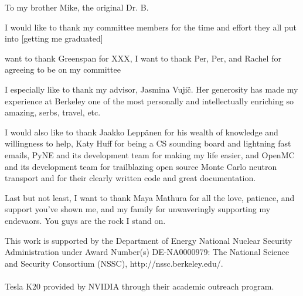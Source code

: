 \documentclass{ucbthesis}
\begin{document}
\begin{frontmatter}

\begin{dedication}
\null\vfil
\begin{center}
To my brother Mike, the original Dr. B. \\\vspace{12pt}

\end{center}
\vfil\null
\end{dedication}

\tableofcontents
\clearpage
\listoffigures
\clearpage
\listoftables

\begin{acknowledgements}

 I would like to thank my committee members for the time and effort they all put into [getting me graduated]
 
 want to thank Greenspan for XXX,  I want to thank Per, Per, and Rachel for agreeing to be on my committee  
  
 I especially like to thank my advisor, Jasmina Vuji{\"c}.  Her generosity has made my experience at Berkeley one of the most personally and intellectually enriching 
 	 so amazing, serbs, travel, etc.

I would also like to thank Jaakko Lepp{\"a}nen for his wealth of knowledge and willingness to help, Katy Huff for being a CS sounding board and lightning fast emails, PyNE and its development team for making my life easier, and OpenMC and its development team for trailblazing open source Monte Carlo neutron transport and for their clearly written code and great documentation.	  

Last but not least, I want to thank Maya Mathura for all the love, patience, and support you've shown me, and my family for unwaveringly supporting my endevaors.  You guys are the rock I stand on.  

\vfill
\noindent This work is supported by the Department of Energy National Nuclear Security Administration under Award Number(s) DE-NA0000979: The National Science and Security Consortium (NSSC), http://nssc.berkeley.edu/.
\\ \\
\noindent Tesla K20 provided by NVIDIA through their academic outreach program.

\end{acknowledgements}

\end{frontmatter}

\pagestyle{headings}

\let\originaleqref\eqref
\renewcommand{\eqref}{Eq.~\originaleqref}






\begin{appendix}


\end{appendix}

\printbibliography
\end{document}
